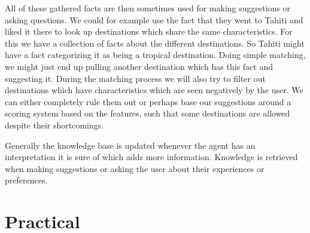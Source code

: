 \documentclass[11pt]{article} %
\begin{document}
All of these gathered facts are then sometimes used for making suggestions or asking questions. We could for example use the fact that they went to Tahiti and liked it there to look up destinations which share the same characteristics. For this we have a collection of facts about the different destinations. So Tahiti might have a fact categorizing it as being a tropical destination. Doing simple matching, we might just end up pulling another destination which has this fact and suggesting it. During the matching process we will also try to filter out destinations which have characteristics which are seen negatively by the user. We can either completely rule them out or perhaps base our suggestions around a scoring system based on the features, such that some destinations are allowed despite their shortcomings.


Generally the knowledge base is updated whenever the agent has an interpretation it is sure of which adds more information. Knowledge is retrieved when making suggestions or asking the user about their experiences or preferences.


\section{Practical}
\end{document}
